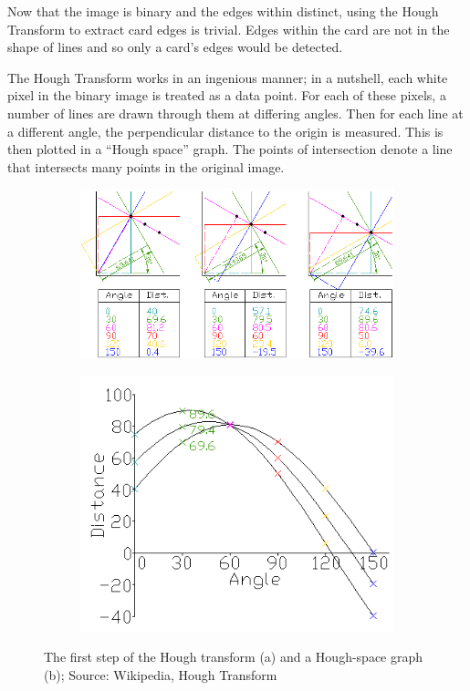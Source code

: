 \documentclass[a4paper,12pt,notitlepage]{article}
\begin{document}
			Now that the image is binary and the edges within distinct, using the Hough Transform to extract card edges is trivial. Edges within the card are not in the shape of lines and so only a card's edges would be detected.

			The Hough Transform works in an ingenious manner; in a nutshell, each white pixel in the binary image is treated as a data point. For each of these pixels, a number of lines are drawn through them at differing angles. Then for each line at a different angle, the perpendicular distance to the origin is measured. This is then plotted in a ``Hough space'' graph. The points of intersection denote a line that intersects many points in the original image. 

			\begin{figure}[H]
				\centering
				\begin{subfigure}[b]{0.55\textwidth}
					\centering
					\includegraphics[width=\textwidth]{hough1}
					\caption{}
				\end{subfigure}
				\begin{subfigure}[b]{0.4\textwidth}
					\centering
					\includegraphics[width=\textwidth]{hough2}
					\caption{}
				\end{subfigure}
				\caption{The first step of the Hough transform (a) and a Hough-space graph (b); Source: Wikipedia, Hough Transform}
				\label{fig:houghmath}
			\end{figure}
\end{document}

